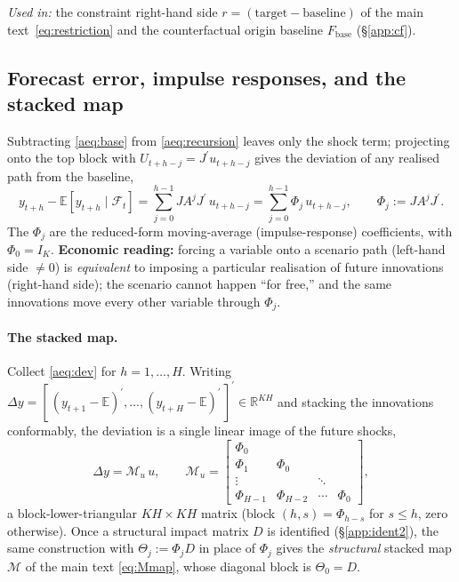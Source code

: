 \documentclass[11pt]{article}
\newcommand{\E}{\mathbb{E}}
\newcommand{\Fset}{\mathcal{F}}
\newcommand{\R}{\mathbb{R}}
\newcommand{\tp}{^{\prime}}
\newcommand{\Mmap}{\mathcal{M}}
\theoremstyle{remark}
\begin{document}
\medskip
\noindent\textit{Used in:} the constraint right-hand side
$r=(\text{target}-\text{baseline})$ of the main text~\eqref{eq:restriction} and the counterfactual
origin baseline $F_{\text{base}}$ (\S\ref{app:cf}).

\subsection{Forecast error, impulse responses, and the stacked map}\label{app:ma}
Subtracting \eqref{aeq:base} from \eqref{aeq:recursion} leaves only the shock
term; projecting onto the top block with $U_{t+h-j}=J\tp u_{t+h-j}$ gives the
deviation of any realised path from the baseline,
\begin{equation}
y_{t+h}-\E[y_{t+h}\mid\Fset_t]
=\sum_{j=0}^{h-1}JA^{j}J\tp\,u_{t+h-j}
=\sum_{j=0}^{h-1}\Phi_j\,u_{t+h-j},
\qquad \Phi_j:=JA^{j}J\tp.
\tag{5}\label{aeq:dev}
\end{equation}
The $\Phi_j$ are the reduced-form moving-average (impulse-response) coefficients,
with $\Phi_0=I_K$. \textbf{Economic reading:} forcing a variable onto a scenario
path (left-hand side $\neq0$) is \emph{equivalent} to imposing a particular
realisation of future innovations (right-hand side); the scenario cannot happen
``for free,'' and the same innovations move every other variable through $\Phi_j$.

\paragraph{The stacked map.} Collect \eqref{aeq:dev} for $h=1,\dots,H$. Writing
$\Delta y=[\,(y_{t+1}-\E)\tp,\dots,(y_{t+H}-\E)\tp\,]\tp\in\R^{KH}$ and stacking
the innovations conformably, the deviation is a single linear image of the future
shocks,
\begin{equation}
\Delta y=\Mmap_u\,u,\qquad
\Mmap_u=\begin{bmatrix}
\Phi_0 & & &\\
\Phi_1 & \Phi_0 & &\\
\vdots & & \ddots &\\
\Phi_{H-1} & \Phi_{H-2} & \cdots & \Phi_0
\end{bmatrix},
\tag{5$'$}\label{aeq:stack}
\end{equation}
a block-lower-triangular $KH\times KH$ matrix (block $(h,s)=\Phi_{h-s}$ for
$s\le h$, zero otherwise). Once a structural impact matrix $D$ is identified
(\S\ref{app:ident2}), the same construction with $\Theta_j:=\Phi_jD$ in place of
$\Phi_j$ gives the \emph{structural} stacked map $\Mmap$ of the main text
\eqref{eq:Mmap}, whose diagonal block is $\Theta_0=D$.
\end{document}
